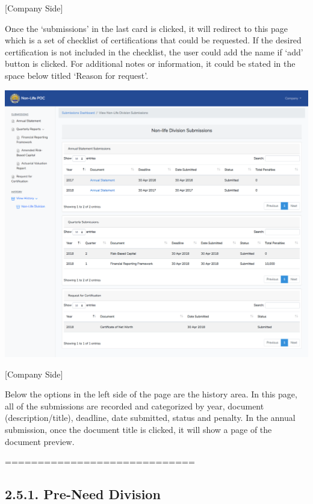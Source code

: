 \documentclass{article}
\begin{document}
[Company Side]%

Once the ‘submissions’ in the last card is clicked, it
will redirect to this page which is a set of checklist of certifications
that could be requested. If the desired certification is not included in
the checklist, the user could add the name if ‘add’ button is clicked.
For additional notes or information, it could be stated in the space
below titled ‘Reason for request’.%

\includegraphics[keepaspectratio=true]{up-ic-screens/image7}{}%

[Company Side]%

Below the options in the left side of the page are the
history area. In this page, all of the submissions are recorded and
categorized by year, document (description/title), deadline, date
submitted, status and penalty. In the annual submission, once the
document title is clicked, it will show a page of the document
preview.%

\mdhr{}%

\noindent{}=============================%

\subsection{2.5.\hspace*{0.5em}1.  Pre-Need Division}\label{sec-1-pre-need-division}%
\end{document}
